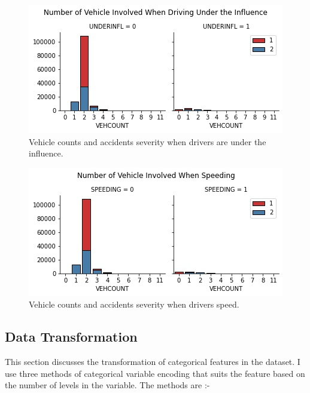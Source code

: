 \documentclass[a4paper,12pt]{article}
\begin{document}
\begin{figure}[H]
	\centering
	\includegraphics[width=1.0\textwidth]{un_sev_hist.jpg}
	\caption{Vehicle counts and accidents severity when drivers are under the influence.}
	\label{fig6}
\end{figure}

\begin{figure}[H]
	\centering
	\includegraphics[width=1.0\textwidth]{sp_sev_hist.jpg}
	\caption{Vehicle counts and accidents severity when drivers speed.}
	\label{fig7}
\end{figure}

\subsection{Data Transformation}
This section discusses the transformation of categorical features in the dataset. I use three methods of categorical variable encoding that suits the feature based on the number of levels in the variable. The methods are :-
\end{document}
